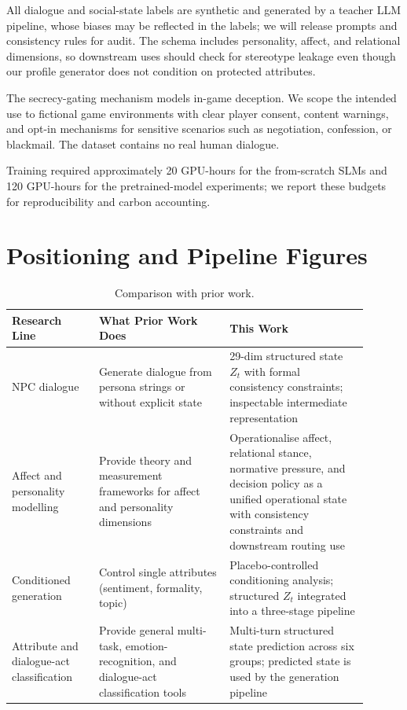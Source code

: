 \documentclass[11pt]{article}
\begin{document}
All dialogue and social-state labels are synthetic and generated by a teacher LLM pipeline, whose biases may be reflected in the labels; we will release prompts and consistency rules for audit. The schema includes personality, affect, and relational dimensions, so downstream uses should check for stereotype leakage even though our profile generator does not condition on protected attributes.

The secrecy-gating mechanism models in-game deception. We scope the intended use to fictional game environments with clear player consent, content warnings, and opt-in mechanisms for sensitive scenarios such as negotiation, confession, or blackmail. The dataset contains no real human dialogue.

Training required approximately 20 GPU-hours for the from-scratch SLMs and 120 GPU-hours for the pretrained-model experiments; we report these budgets for reproducibility and carbon accounting.



\appendix

\section{Positioning and Pipeline Figures}
\label{app:positioning}

\begin{table}[tp]
\centering
\caption{Comparison with prior work.}
\label{tab:novelty}
\footnotesize\setlength{\tabcolsep}{2pt}
\begin{tabular}{@{}p{0.22\linewidth}p{0.33\linewidth}p{0.35\linewidth}@{}}
\toprule
\textbf{Research Line} & \textbf{What Prior Work Does} & \textbf{This Work} \\
\midrule
NPC dialogue~\cite{park2023generative,wang2023voyager,urbanek2019learning}
    & Generate dialogue from persona strings or without explicit state
    & 29-dim structured state $Z_t$ with formal consistency constraints; inspectable intermediate representation \\
\midrule
Affect and personality modelling~\cite{oatley1987towards,russell1980circumplex,digman1990personality}
    & Provide theory and measurement frameworks for affect and personality dimensions
    & Operationalise affect, relational stance, normative pressure, and decision policy as a unified operational state with consistency constraints and downstream routing use \\
\midrule
Conditioned generation~\cite{li2021prefix,keskar2019ctrl,dathathri2020plug}
    & Control single attributes (sentiment, formality, topic)
    & Placebo-controlled conditioning analysis; structured $Z_t$ integrated into a three-stage pipeline \\
\midrule
Attribute and dialogue-act classification~\cite{liu2019multi,li2021past,raheja2019dialogue}
    & Provide general multi-task, emotion-recognition, and dialogue-act classification tools
    & Multi-turn structured state prediction across six groups; predicted state is used by the generation pipeline \\
\bottomrule
\end{tabular}
\end{table}
\end{document}

